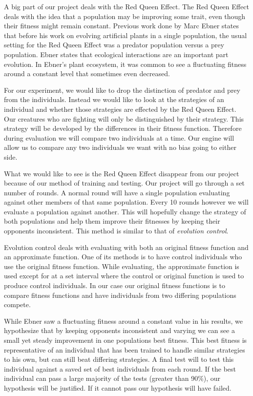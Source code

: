 \documentclass{acm_proc_article-sp}
\begin{document}
A big part of our project deals with the Red Queen Effect. The Red Queen Effect deals with the idea that a population may be improving some trait, even though their fitness might remain constant\cite{Ebner}. Previous work done by Marc Ebner\cite{Ebner} states that before his work on evolving artificial plants in a single population, the usual setting for the Red Queen Effect was a predator population versus a prey population\cite{Ebner}. Ebner states that ecological interactions are an important part evolution. In Ebner's plant ecosystem, it was common to see a fluctuating fitness around a constant level that sometimes even decreased.

For our experiment, we would like to drop the distinction of predator and prey from the individuals. Instead we would like to look at the strategies of an individual and whether those strategies are effected by the Red Queen Effect. Our creatures who are fighting will only be distinguished by their strategy. This strategy will be developed by the differences in their fitness function. Therefore during evaluation we will compare two individuals at a time. Our engine will allow us to compare any two individuals we want with no bias going to either side.

What we would like to see is the Red Queen Effect disappear from our project because of our method of training and testing. Our project will go through a set number of rounds. A normal round will have a single population evaluating against other members of that same population. Every 10 rounds however we will evaluate a population against another. This will hopefully change the strategy of both populations and help them improve their fitnesses by keeping their opponents inconsistent. This method is similar to that of \textit{evolution control}\cite{Fitness}.

Evolution control deals with evaluating with both an original fitness function and an approximate function. One of its methods is to have control individuals who use the original fitness function. While evaluating, the approximate function is used except for at a set interval where the control or original function is used to produce control individuals. In our case our original fitness functions is to compare fitness functions and have individuals from two differing populations compete. %

While Ebner saw a fluctuating fitness around a constant value in his results\cite{Ebner}, we hypothesize that by keeping opponents inconsistent and varying we can see a small yet steady improvement in one populations best fitness. This best fitness is representative of an individual that has been trained to handle similar strategies to his own, but can still beat differing strategies. A final test will to test this individual against a saved set of best individuals from each round. If the best individual can pass a large majority of the tests (greater than 90\%), our hypothesis will be justified. If it cannot pass our hypothesis will have failed.
\end{document}
